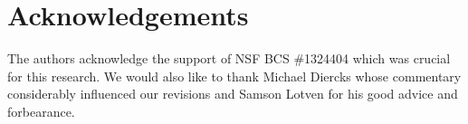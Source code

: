 \documentclass[output=paper,
modfonts
]{langscibook}
\begin{document}
\section*{Acknowledgements}

The authors acknowledge the support of NSF BCS \#1324404 which was crucial for this research. We would also like to thank Michael Diercks whose commentary considerably influenced our revisions and Samson Lotven for his good advice and forbearance. 


{\sloppy
\printbibliography[heading=subbibliography,notkeyword=this] 
}
\end{document}
